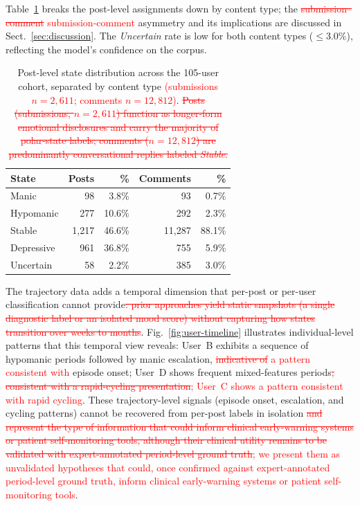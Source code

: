 \documentclass[runningheads]{llncs}
\newcommand{\rev}[1]{\textcolor{red}{#1}}
\newcommand{\del}[1]{\textcolor{red}{\sout{#1}}}
\newcommand{\rev}[1]{#1}
\newcommand{\del}[1]{}
\begin{document}
Table~\ref{tab:post-state-dist} breaks the post-level assignments down by content type; the \del{submission--comment} \rev{submission-comment} asymmetry and its implications are discussed in Sect.~\ref{sec:discussion}. The \emph{Uncertain} rate is low for both content types ($\leq$3.0\%), reflecting the model's confidence on the corpus.

\begin{table}[t]
\caption{Post-level state distribution across the 105-user cohort, separated by content type \rev{(submissions $n = 2{,}611$; comments $n = 12{,}812$)}.\del{ Posts (submissions, $n = 2{,}611$) function as longer-form emotional disclosures and carry the majority of polar-state labels; comments ($n = 12{,}812$) are predominantly conversational replies labeled \emph{Stable}.}}
\label{tab:post-state-dist}
\centering
\setlength{\tabcolsep}{8pt}
\begin{tabular}{lrrrr}
\toprule
\textbf{State} & \textbf{Posts} & \textbf{\%} & \textbf{Comments} & \textbf{\%} \\
\midrule
Manic & 98 & 3.8\% & 93 & 0.7\% \\
Hypomanic & 277 & 10.6\% & 292 & 2.3\% \\
Stable & 1,217 & 46.6\% & 11,287 & 88.1\% \\
Depressive & 961 & 36.8\% & 755 & 5.9\% \\
Uncertain & 58 & 2.2\% & 385 & 3.0\% \\
\bottomrule
\end{tabular}
\end{table}

The trajectory data adds a temporal dimension that per-post or per-user classification cannot provide\del{: prior approaches yield static snapshots (a single diagnostic label or an isolated mood score) without capturing how states transition over weeks to months}. Fig.~\ref{fig:user-timeline} illustrates individual-level patterns that this temporal view reveals: User~B exhibits a sequence of hypomanic periods followed by manic escalation, \del{indicative of} \rev{a pattern consistent with} episode onset; User~D shows frequent mixed-features periods\del{, consistent with a rapid-cycling presentation}\rev{; User~C shows a pattern consistent with rapid cycling}. These trajectory-level signals (episode onset, escalation, and cycling patterns) cannot be recovered from per-post labels in isolation\del{ and represent the type of information that could inform clinical early-warning systems or patient self-monitoring tools, although their clinical utility remains to be validated with expert-annotated period-level ground truth}\rev{; we present them as unvalidated hypotheses that could, once confirmed against expert-annotated period-level ground truth, inform clinical early-warning systems or patient self-monitoring tools}.
\end{document}
